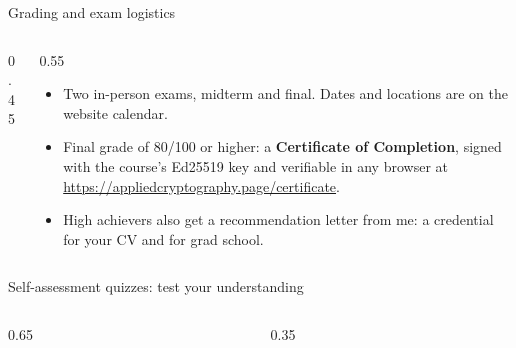 \ifdefined\PRESENTATION\else\PassOptionsToClass{handout}{beamer}\fi\documentclass[aspectratio=169, lualatex]{beamer}
\begin{document}
\begin{frame}{Grading and exam logistics}
	\begin{columns}[c]
		\begin{column}{0.45\textwidth}
		\end{column}
		\begin{column}{0.55\textwidth}
			\begin{itemize}[<+->]
				\item Two in-person exams, midterm and final. Dates and locations are on the website calendar.
				\item Final grade of 80/100 or higher: a \textbf{Certificate of Completion}, signed with the course's Ed25519 key and verifiable in any browser at \url{https://appliedcryptography.page/certificate}.
				\item High achievers also get a recommendation letter from me: a credential for your CV and for grad school.
			\end{itemize}
		\end{column}
	\end{columns}
\end{frame}

\begin{frame}{Self-assessment quizzes: test your understanding}
	\begin{columns}[c]
		\begin{column}{0.65\textwidth}
		\end{column}
		\begin{column}{0.35\textwidth}
		\end{column}
	\end{columns}
\end{frame}
\end{document}
